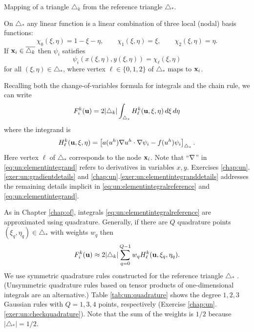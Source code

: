 \begin{marginfigure}

\caption{Mapping of a triangle $\triangle_k$ from the reference triangle $\triangle_\ast$.}
\label{fig:isoparametric}
\end{marginfigure}

On $\triangle_\ast$ any linear function is a linear combination of three local (nodal) basis functions:
\begin{equation}
\chi_0(\xi,\eta) = 1-\xi-\eta, \qquad \chi_1(\xi,\eta) = \xi, \qquad \chi_2(\xi,\eta) = \eta. \label{eq:un:chiformulas}
\end{equation}
If $\mathbf{x}_i\in\overline{\triangle_k}$ then $\psi_i$ satisfies
\begin{equation}
\psi_i(x(\xi,\eta),y(\xi,\eta)) = \chi_\ell(\xi,\eta) \label{eq:un:psichimap}
\end{equation}
for all $(\xi,\eta)\in\triangle_\ast$, where vertex $\ell \in \{0,1,2\}$ of $\triangle_\ast$ maps to $\mathbf{x}_i$.

Recalling both the change-of-variables formula for integrals and the chain rule, we can write
\begin{equation}
F_i^k(\mathbf{u}) = 2 |\triangle_k| \int_{\triangle_\ast} H_\ell^k(\mathbf{u},\xi,\eta)\,d\xi\,d\eta \label{eq:un:elementintegralreference}
\end{equation}
where the integrand is
\begin{equation}
H_\ell^k(\mathbf{u},\xi,\eta) = \left[a(u^h) \nabla u^h \cdot \nabla \psi_i - f(u^h) \psi_i\right]_{\triangle_\ast}.  \label{eq:un:elementintegrand}
\end{equation}
Here vertex $\ell$ of $\triangle_\ast$ corresponds to the node $\mathbf{x}_i$.  Note that ``$\nabla$'' in \eqref{eq:un:elementintegrand} refers to derivatives in variables $x,y$.  Exercises \ref{chap:un}.\ref{exer:un:gradientdetails} and \ref{chap:un}.\ref{exer:un:elementintegranddetails} addresses the remaining details implicit in \eqref{eq:un:elementintegralreference} and \eqref{eq:un:elementintegrand}.

As in Chapter \ref{chap:of}, integrals \eqref{eq:un:elementintegralreference} are approximated using quadrature.  Generally, if there are $Q$ quadrature points $(\xi_q,\eta_q) \in \triangle_\ast$ with weights $w_q$ then
\begin{equation}
F_i^k(\mathbf{u}) \approx 2 |\triangle_k| \sum_{q=0}^{Q-1} w_q H_\ell^k(\mathbf{u},\xi_q,\eta_q). \label{eq:un:elementquadraturereference}
\end{equation}
We use symmetric quadrature rules constructed for the reference triangle $\triangle_\ast$ \citep{Dunavant1985}.  (Unsymmetric quadrature rules based on tensor products of one-dimensional integrals \citep{KarniadakisSherwin2013} are an alternative.)  Table \ref{tab:un:quadrature} shows the degree $1,2,3$ Gaussian rules with $Q=1,3,4$ points, respectively (Exercise \ref{chap:un}.\ref{exer:un:checkquadrature}).  Note that the sum of the weights is $1/2$ because $|\triangle_\ast|=1/2$.

